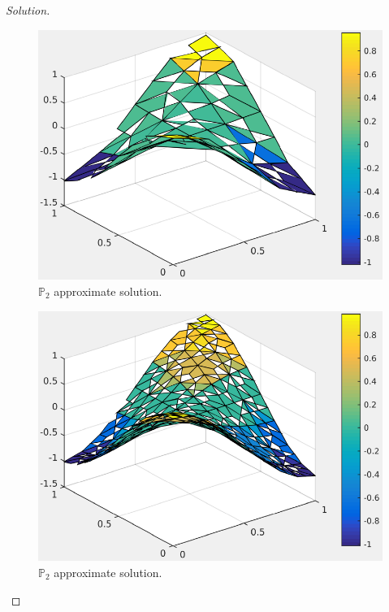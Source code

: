\documentclass[11pt,a4paper,center,notitlepage]{article}
\numberwithin{equation}{section}
\begin{document}
\begin{proof}[Solution]
\begin{figure}[H]
\centering
\includegraphics[scale=0.9]{appro_solution_2_P2}
\caption{$\mathbb{P}_2$ approximate solution.}
\end{figure} 

\begin{figure}[H]
\centering
\includegraphics[scale=0.9]{appro_solution_3_P2}
\caption{$\mathbb{P}_2$ approximate solution.}
\end{figure} 


\end{proof}
\end{document}
